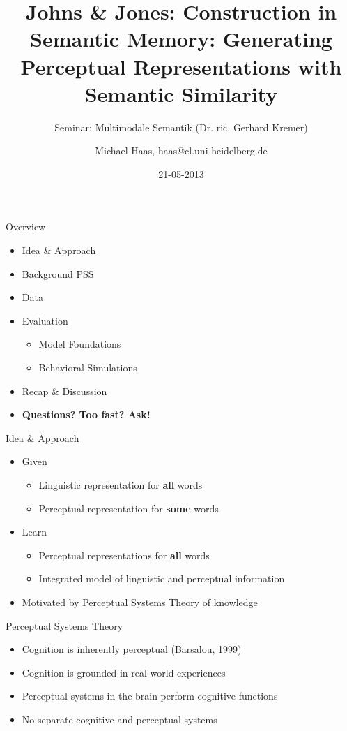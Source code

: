 \documentclass[12pt,a4paper]{beamer}
\author{Michael Haas, haas@cl.uni-heidelberg.de}
\title{Johns \& Jones: Construction in Semantic Memory: Generating Perceptual Representations with Semantic Similarity}
\subtitle{Seminar: Multimodale Semantik (Dr. ric. Gerhard Kremer)}
\date{21-05-2013}
\begin{document}
\begin{frame}
\maketitle
\end{frame}

\begin{frame}{Overview}
\begin{itemize}
\item Idea \& Approach %
\item Background PSS
\item Data
\item Evaluation
    \begin{itemize}
    \item Model Foundations
    \item Behavioral Simulations
    \end{itemize}
\item Recap \& Discussion
\item \textbf{Questions? Too fast? Ask!}
\end{itemize}
\end{frame}


\begin{frame}{Idea \& Approach}
\begin{itemize}
\item Given
    \begin{itemize}
    \item Linguistic representation for \textbf{all} words
    \item Perceptual representation for \textbf{some} words
    \end{itemize}
\item Learn
    \begin{itemize}
    \item Perceptual representations for \textbf{all} words
    \item Integrated model of linguistic and perceptual information
    \end{itemize}
\item Motivated by Perceptual Systems Theory of knowledge
\end{itemize}
\end{frame}

\begin{frame}{Perceptual Systems Theory}
\begin{itemize}
\item Cognition is inherently perceptual (Barsalou, 1999) %
\item Cognition is grounded in real-world experiences
\item Perceptual systems in the brain perform cognitive functions
\item No separate cognitive and perceptual systems
\end{itemize}
\end{frame}
\end{document}
